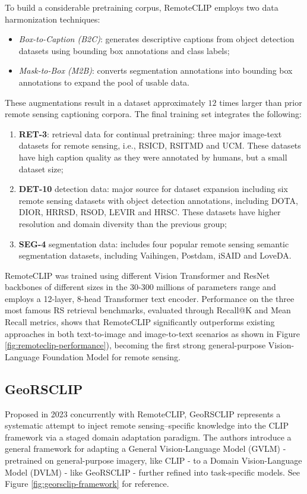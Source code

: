 \documentclass[a4paper, oneside, english]{sapthesis} %
\begin{document}
To build a considerable pretraining corpus, RemoteCLIP employs two data harmonization techniques:

\begin{itemize}
    \item \emph{Box-to-Caption (B2C)}: generates descriptive captions from object detection datasets using bounding box annotations and class labels;
    \item \emph{Mask-to-Box (M2B)}: converts segmentation annotations into bounding box annotations to expand the pool of usable data.
\end{itemize}
These augmentations result in a dataset approximately $12$ times larger than prior remote sensing captioning corpora. The final training set integrates the following:
\begin{enumerate}
    \item \textbf{RET-3}: retrieval data for continual pretraining: three major image-text datasets for remote sensing, i.e., RSICD, RSITMD and UCM. These datasets have high caption quality as they were annotated by humans, but a small dataset size;
    \item \textbf{DET-10} detection data: major source for dataset expansion including six remote sensing datasets with object detection annotations, including DOTA, DIOR, HRRSD, RSOD, LEVIR and HRSC. These datasets have higher resolution and domain diversity than the previous group;
    \item \textbf{SEG-4} segmentation data: includes four popular remote sensing semantic segmentation datasets, including Vaihingen, Postdam, iSAID and LoveDA.
\end{enumerate}

RemoteCLIP was trained using different Vision Transformer and ResNet backbones of different sizes in the 30-300 millions of parameters range and employs a 12-layer, 8-head Transformer text encoder. Performance on the three most famous RS retrieval benchmarks, evaluated through Recall@K and Mean Recall metrics, shows that RemoteCLIP significantly outperforms existing approaches in both text-to-image and image-to-text scenarios as shown in Figure \ref{fig:remoteclip-performance}), becoming the first strong general-purpose Vision-Language Foundation Model for remote sensing.

\subsection{GeoRSCLIP}

Proposed in 2023 concurrently with RemoteCLIP, GeoRSCLIP \cite{zhang2024rs5m} represents a systematic attempt to inject remote sensing–specific knowledge into the CLIP framework via a staged domain adaptation paradigm. The authors introduce a general framework for adapting a General Vision-Language Model (GVLM) - pretrained on general-purpose imagery, like CLIP - to a Domain Vision-Language Model (DVLM) - like GeoRSCLIP - further refined into task-specific models. See Figure \ref{fig:georsclip-framework} for reference.
\end{document}
